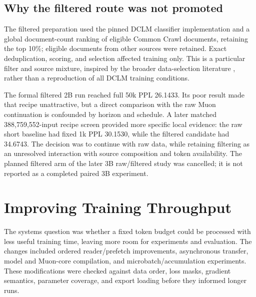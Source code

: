 
\subsection{Why the filtered route was not promoted}

The filtered preparation used the pinned DCLM classifier implementation and a global document-count ranking of eligible Common Crawl documents, retaining the top 10\%; eligible documents from other sources were retained. Exact deduplication, scoring, and selection affected training only. This is a particular filter and source mixture, inspired by the broader data-selection literature \citep{dclm}, rather than a reproduction of all DCLM training conditions.

The formal filtered 2B run reached full 50k PPL 26.1433. Its poor result made that recipe unattractive, but a direct comparison with the raw Muon continuation is confounded by horizon and schedule. A later matched 388,759,552-input recipe screen provided more specific local evidence: the raw short baseline had fixed 1k PPL 30.1530, while the filtered candidate had 34.6743. The decision was to continue with raw data, while retaining filtering as an unresolved interaction with source composition and token availability. The planned filtered arm of the later 3B raw/filtered study was cancelled; it is not reported as a completed paired 3B experiment.

\section{Improving Training Throughput}
\label{sec:systems}

The systems question was whether a fixed token budget could be processed with less useful training time, leaving more room for experiments and evaluation. The changes included ordered reader/prefetch improvements, asynchronous transfer, model and Muon-core compilation, and microbatch/accumulation experiments. These modifications were checked against data order, loss masks, gradient semantics, parameter coverage, and export loading before they informed longer runs.

